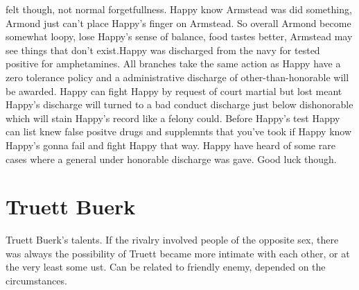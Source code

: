 \documentclass[12pt]{book}
\begin{document}
felt though, not normal forgetfullness. Happy know Armstead was did something, Armond just can't place Happy's finger on Armstead. So overall Armond become somewhat loopy, lose Happy's sense of balance, food tastes better, Armstead may see things that don't exist.Happy was discharged from the navy for tested positive for amphetamines. All branches take the same action as Happy have a zero tolerance policy and a administrative discharge of other-than-honorable will be awarded. Happy can fight Happy by request of court martial but lost meant Happy's discharge will turned to a bad conduct discharge just below dishonorable which will stain Happy's record like a felony could. Before Happy's test Happy can list knew false positve drugs and supplemnts that you've took if Happy know Happy's gonna fail and fight Happy that way. Happy have heard of some rare cases where a general under honorable discharge was gave. Good luck though.



\chapter{Truett Buerk}

Truett Buerk's talents. If the rivalry involved people of the opposite sex, there was always the possibility of Truett became more intimate with each other, or at the very least some ust. Can be related to friendly enemy, depended on the circumstances.
\end{document}
